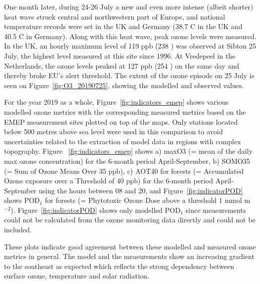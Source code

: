 One month later, during 24-26 July a new and even more intense (albeit shorter) heat wave struck central and northwestern part of Europe, and national temperature records were set in the UK and Germany (38.7 \degrees C in the UK and 40.5 \degrees C in Germany). Along with this heat wave, peak ozone levels were measured. In the UK, an hourly maximum level of 119 ppb (238 \ug) was observed at Sibton 25 July, the highest level measured at this site since 1996. At Vredepeel in the Netherlands, the ozone levels peaked at 127 ppb (254 \ug) on the same day and thereby broke EU's alert threshold. The extent of the ozone episode on 25 July is seen on Figure~\ref{fig:O3_20190725}, showing the modelled and observed values. 


For the year 2019 as a whole, Figure~\ref{fig:indicators_emep} shows various modelled ozone metrics with the corresponding measured metrics based on the EMEP measurement sites plotted on top of the maps. Only stations located below 500 metres above sea level were used in this comparison to avoid uncertainties related to the extraction of model data in regions with complex topography. Figure ~\ref{fig:indicators_emep} shows a) maxO3 (= mean of the daily max ozone concentration) for the 6-month period April-September, b) SOMO35 (= Sum of Ozone Means Over 35 ppb), c) AOT40 for forests (= Accumulated Ozone exposure over a Threshold of 40 ppb) for the 6-month period April-September using the hours between 08 and 20, and Figure~\ref{fig:indicatorPOD} shows POD$_1$ for forests (= Phytotoxic Ozone Dose above a threshold 1 mmol m$^{-2}$). Figure~\ref{fig:indicatorPOD} shows only modelled POD$_1$ since measurements could not be calculated from the ozone monitoring data directly and could not be included.

These plots indicate good agreement between these modelled and measured ozone metrics in general. The model and the measurements show an increasing gradient to the southeast as expected which reflects the strong dependency between surface ozone, temperature and solar radiation. 

